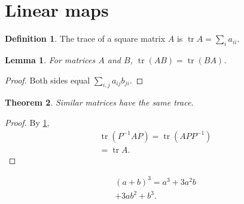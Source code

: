 \documentclass{article}
\newtheorem{theorem}{Theorem}[section]
\newtheorem{lemma}[theorem]{Lemma}
\theoremstyle{definition}
\newtheorem{definition}{Definition}
\DeclareMathOperator{\tr}{tr}
\begin{document}
\section{Linear maps}
\begin{definition}
The trace of a square matrix $A$ is $\tr A = \sum_i a_{ii}$.
\end{definition}

\begin{lemma}\label{lem:cyclic}
For matrices $A$ and $B$, $\tr(AB) = \tr(BA)$.
\end{lemma}
\begin{proof}
Both sides equal $\sum_{i,j} a_{ij} b_{ji}$.
\end{proof}

\begin{theorem}
Similar matrices have the same trace.
\end{theorem}
\begin{proof}
By \cref{lem:cyclic},
\begin{gather}
  \tr(P^{-1}AP) = \tr(APP^{-1}) \\
  = \tr A.
\end{gather}
\end{proof}

\begin{multline}
  (a+b)^3 = a^3 + 3a^2b \\
  + 3ab^2 + b^3.
\end{multline}
\end{document}
